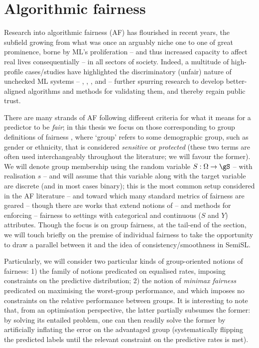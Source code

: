 \section{Algorithmic fairness}\label{sec:fairml}
Research into algorithmic fairness (AF) has flourished in recent years, the subfield growing
from what was once an arguably niche one to one of great prominence, borne by ML's proliferation --
and thus increased capacity to affect real lives consequentially -- in all sectors of society.
%
Indeed, a multitude of high-profile cases/studies have highlighted the discriminatory (unfair)
nature of unchecked ML systems -- \cite{kasperkevic2015google}, \cite{angwin2016machine},
\cite{dastin2018amazon}, and \cite{buolamwini2018gender} -- further spurring research to develop
better-aligned algorithms and methods for validating them, and thereby regain public trust.

%
There are many strands of AF following different criteria for what it means for a
predictor to be \emph{fair}; in this thesis we focus on those corresponding to group definitions of
fairness \citep{barocas2019fairness}, where `group' refers to some demographic group, such as
gender or ethnicity, that is considered \emph{sensitive} or \emph{protected} (these two terms are
often used interchangeably throughout the literature; we will favour the former).
%
We will denote group membership using the random variable \( S: \Omega \to \gS \) -- with
realisation \(s\) -- and will assume that this variable along with the target variable are discrete
(and in most cases binary); this is the most common setup considered in the AF literature --
and toward which many standard metrics of fairness are geared \citep{feldman2015certifying,
hardt2016equality, woodworth2017learning} -- though there are works that extend notions of -- and
methods for enforcing -- fairness to settings with categorical and continuous (\( S \) and \( Y \))
attributes.
%
Though the focus is on group fairness, at the tail-end of the section, we will touch briefly on the
premise of individual fairness \citep{dwork2012fairness} to take the opportunity to draw a parallel
between it and the idea of consistency/smoothness in SemiSL.

%
Particularly, we will consider two particular kinds of group-oriented notions of fairness: 1) the
family of notions predicated on equalised rates, imposing constraints on the predictive
distribution; 2) the notion of \emph{minimax fairness} predicated on maximising the worst-group
performance, and which imposes no constraints on the relative performance between groups.
%
It is interesting to note that, from an optimisation perspective, the latter partially subsumes the
former: by solving its entailed problem, one can then readily solve the former by artificially
inflating the error on the advantaged group (systematically flipping the predicted labels until the
relevant constraint on the predictive rates is met).

